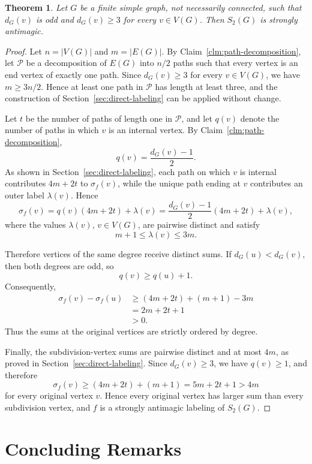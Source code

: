 \documentclass[preprint,12pt]{elsarticle}
\newtheorem{theorem}{Theorem}[section]
\begin{document}
\begin{theorem}
\label{thm:odd-degree-extension}
Let \(G\) be a finite simple graph, not necessarily connected, such that
\(d_G(v)\) is odd and \(d_G(v)\ge3\) for every \(v\in V(G)\). Then
\(S_2(G)\) is strongly antimagic.
\end{theorem}

\begin{proof}
Let \(n=|V(G)|\) and \(m=|E(G)|\). By
Claim~\ref{clm:path-decomposition}, let \(\mathcal P\) be a decomposition
of \(E(G)\) into \(n/2\) paths such that every vertex is an end vertex of
exactly one path. Since \(d_G(v)\ge3\) for every \(v\in V(G)\), we have
\(m\ge3n/2\). Hence at least one path in \(\mathcal P\) has length at
least three, and the construction of
Section~\ref{sec:direct-labeling} can be applied without change.

Let \(t\) be the number of paths of length one in \(\mathcal P\), and let
\(q(v)\) denote the number of paths in which \(v\) is an internal vertex.
By Claim~\ref{clm:path-decomposition},
\[
q(v)=\frac{d_G(v)-1}{2}.
\]
As shown in Section~\ref{sec:direct-labeling}, each path on which \(v\)
is internal contributes \(4m+2t\) to \(\sigma_f(v)\), while the unique
path ending at \(v\) contributes an outer label \(\lambda(v)\). Hence
\[
\sigma_f(v)
=
q(v)(4m+2t)+\lambda(v)
=
\frac{d_G(v)-1}{2}(4m+2t)+\lambda(v),
\]
where the values \(\lambda(v)\), \(v\in V(G)\), are pairwise distinct
and satisfy
\[
m+1\le\lambda(v)\le3m.
\]

Therefore vertices of the same degree receive distinct sums. If
\(d_G(u)<d_G(v)\), then both degrees are odd, so
\[
q(v)\ge q(u)+1.
\]
Consequently,
\[
\begin{aligned}
\sigma_f(v)-\sigma_f(u)
&\ge (4m+2t)+(m+1)-3m\\
&=2m+2t+1\\
&>0.
\end{aligned}
\]
Thus the sums at the original vertices are strictly ordered by degree.

Finally, the subdivision-vertex sums are pairwise distinct and at most
\(4m\), as proved in Section~\ref{sec:direct-labeling}. Since
\(d_G(v)\ge3\), we have \(q(v)\ge1\), and therefore
\[
\sigma_f(v)
\ge
(4m+2t)+(m+1)
=
5m+2t+1
>
4m
\]
for every original vertex \(v\). Hence every original vertex has larger
sum than every subdivision vertex, and \(f\) is a strongly antimagic
labeling of \(S_2(G)\).
\end{proof}


\section{Concluding Remarks}
\label{sec:conclusion}
\end{document}
